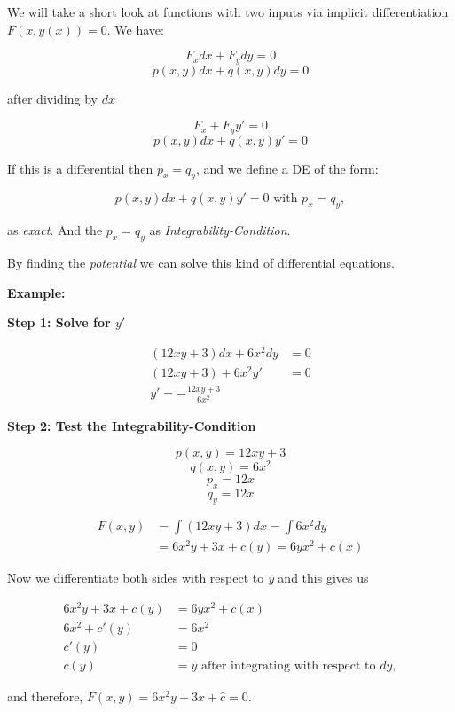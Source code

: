 We will take a short look at functions with two inputs via implicit differentiation \(F(x,y(x)) = 0\).
We have:

\[
    F_x dx + F_y dy = 0
\]
\[
    p(x,y)dx + q(x,y)dy = 0
\]

after dividing by \(dx\)

\[
    F_x + F_y y' = 0
\]
\[
    p(x,y)dx + q(x,y)y' = 0
\]

If this is a differential then \(p_x = q_y\), and we define a DE of the form:

\[
    p(x,y)dx + q(x,y)y' = 0 \text{ with } p_x = q_y,
\]

as \emph{exact}. And the \(p_x = q_y\) as \emph{Integrability-Condition}.
\vspace{\baselineskip}

By finding the \emph{potential} we can solve this kind of differential equations.
\vspace{\baselineskip}

\textbf{Example:}
\vspace{\baselineskip}

\textbf{Step 1: Solve for \(y'\)}

\begin{align*}
    (12xy + 3)dx + 6x^2dy &= 0\\
    (12xy + 3) + 6x^2 y' &= 0\\
    y' = - \frac{12xy + 3}{6x^2}
\end{align*}

\textbf{Step 2: Test the Integrability-Condition}

\[
    p(x,y) = 12xy + 3
\]
\[
    q(x,y) = 6x^2
\] 
\[
    p_x = 12x
\]
\[
    q_y = 12x
\]

\begin{align*}
    F(x,y) &= \int (12xy + 3)dx = \int 6x^2 dy\\
        &= 6x^2 y + 3x + c(y) = 6yx^2 + c(x)
\end{align*}

Now we differentiate both sides with respect to \emph{y} and this gives us

\begin{align*}
    6x^2y + 3x + c(y) &= 6yx^2 + c(x) \\
    6x^2 + c'(y) &= 6x^2 \\
           c'(y) &= 0 \\
            c(y) &= y \text{ after integrating with respect to } dy,
\end{align*}

and therefore, \(F(x,y) = 6x^2y + 3x + \hat{c} = 0\).
\vspace{\baselineskip}

